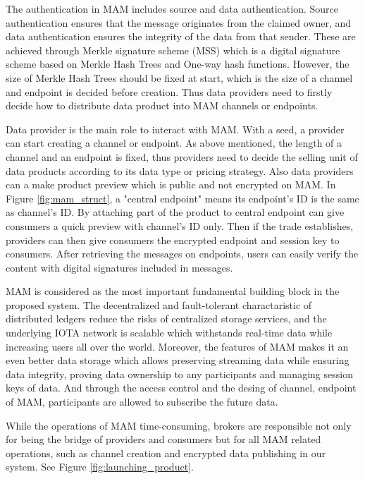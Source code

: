 \documentclass[journal,article,applsci,submit,moreauthors,pdftex]{Definitions/mdpi}
\begin{document}
\begin{itemize}[leftmargin=*,labelsep=5.8mm]
The authentication in MAM includes source and data authentication. Source authentication ensures that the message originates from the claimed owner, and data authentication ensures the integrity of the data from that sender. These are achieved through Merkle signature scheme\cite{MSS} (MSS) which is a digital signature scheme based on Merkle Hash Trees and One-way hash functions. However, the size of Merkle Hash Trees should be fixed at start, which is the size of a channel and endpoint is decided before creation. Thus data providers need to firstly decide how to distribute data product into MAM channels or endpoints.

Data provider is the main role to interact with MAM. With a seed, a provider can start creating a channel or endpoint. As above mentioned, the length of a channel and an endpoint is fixed, thus providers need to decide the selling unit of data products according to its data type or pricing strategy. Also data providers can a make product preview which is public and not encrypted on MAM. In Figure \ref{fig:mam_struct}, a "central endpoint" means its endpoint's ID is the same as channel's ID. By attaching part of the product to central endpoint can give consumers a quick preview with channel's ID only. Then if the trade establishes, providers can then give consumers the encrypted endpoint and session key to consumers. After retrieving the messages on endpoints, users can easily verify the content with digital signatures included in messages. 

MAM is considered as the most important fundamental building block in the proposed system. The decentralized and fault-tolerant charactaristic of distributed ledgers reduce the risks of centralized storage services, and the underlying IOTA network is scalable which withstands real-time data while increasing users all over the world. Moreover, the features of MAM makes it an even better data storage which allows preserving streaming data while ensuring data integrity, proving data ownership to any participants and managing session keys of data. And through the access control and the desing of channel, endpoint of MAM, participants are allowed to subscribe the future data.  

While the operations of MAM time-consuming, brokers are responsible not only for being the bridge of providers and consumers but for all MAM related operations, such as channel creation and encrypted data publishing in our system. See Figure \ref{fig:launching_product}.


\end{itemize}
\end{document}
